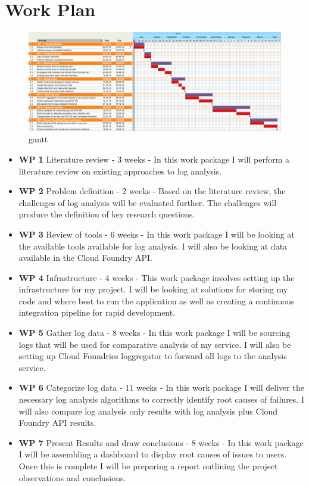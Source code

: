 \chapter{Work Plan}

\begin{figure}[h!]
  \centering
  \includegraphics[width=1.0\textwidth]{./figures/gantt.png}
  \caption{gantt}
  \label{fig:gantt}
\end{figure}

\begin{itemize}
  \item \textbf{WP 1} Literature review - 3 weeks - In this work package I will perform a literature review on existing approaches to log analysis.
  \item \textbf{WP 2} Problem definition - 2 weeks - Based on the literature review, the challenges of log analysis will be evaluated further. The challenges will produce the definition of key research questions.
  \item \textbf{WP 3} Review of tools - 6 weeks - In this work package I will be looking at the available tools available for log analysis. I will also be looking at data available in the Cloud Foundry API.
  \item \textbf{WP 4} Infrastructure - 4 weeks - This work package involves setting up the infrastructure for my project. I will be looking at solutions for storing my code and where best to run the application as well as creating a continuous integration pipeline for rapid development.
  \item \textbf{WP 5} Gather log data - 8 weeks - In this work package I will be sourcing logs that will be used for comparative analysis of my service. I will also be setting up Cloud Foundries loggregator to forward all logs to the analysis service.
  \item \textbf{WP 6} Categorize log data - 11 weeks - In this work package I will deliver the necessary log analysis algorithms to correctly identify root causes of failures. I will also compare log analysis only results with log analysis plus Cloud Foundry API results.
  \item \textbf{WP 7} Present Results and draw conclusions - 8 weeks - In this work package I will be assembling a dashboard to display root causes of issues to users. Once this is complete I will be preparing a report outlining the project observations and conclusions.
\end{itemize}
